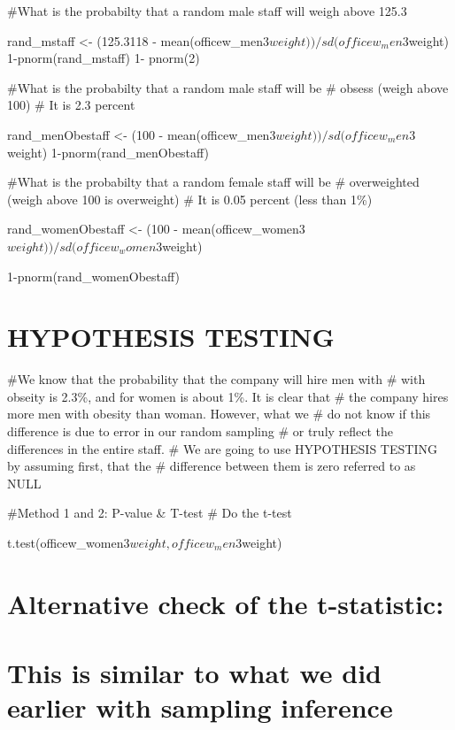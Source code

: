 \documentclass[
]{article}
\begin{document}
\#What is the probabilty that a random male staff will weigh above 125.3

rand\_mstaff \textless- (125.3118 -
mean(officew\_men3\(weight))/sd(officew_men3\)weight)
1-pnorm(rand\_mstaff) 1- pnorm(2)

\#What is the probabilty that a random male staff will be \# obsess
(weigh above 100) \# It is 2.3 percent

rand\_menObestaff \textless- (100 -
mean(officew\_men3\(weight))/sd(officew_men3\)weight)
1-pnorm(rand\_menObestaff)

\#What is the probabilty that a random female staff will be \#
overweighted (weigh above 100 is overweight) \# It is 0.05 percent (less
than 1\%)

rand\_womenObestaff \textless- (100 -
mean(officew\_women3\(weight))/  sd(officew_women3\)weight)

1-pnorm(rand\_womenObestaff)

\hypertarget{hypothesis-testing}{%
\section{HYPOTHESIS TESTING}\label{hypothesis-testing}}

\#We know that the probability that the company will hire men with \#
with obseity is 2.3\%, and for women is about 1\%. It is clear that \#
the company hires more men with obesity than woman. However, what we \#
do not know if this difference is due to error in our random sampling \#
or truly reflect the differences in the entire staff. \# We are going to
use HYPOTHESIS TESTING by assuming first, that the \# difference between
them is zero referred to as NULL

\#Method 1 and 2: P-value \& T-test \# Do the t-test

t.test(officew\_women3\(weight, officew_men3\)weight)

\hypertarget{alternative-check-of-the-t-statistic}{%
\section{Alternative check of the
t-statistic:}\label{alternative-check-of-the-t-statistic}}

\hypertarget{this-is-similar-to-what-we-did-earlier-with-sampling-inference}{%
\section{This is similar to what we did earlier with sampling
inference}\label{this-is-similar-to-what-we-did-earlier-with-sampling-inference}}
\end{document}
